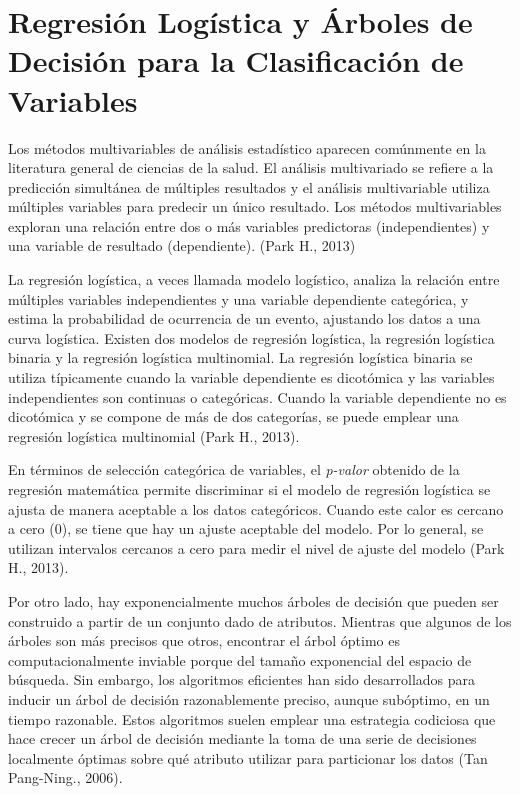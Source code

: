 \section{Regresión Logística y Árboles de Decisión para la Clasificación de Variables}
Los métodos multivariables de análisis estadístico aparecen comúnmente en la literatura general de ciencias de la salud. El análisis multivariado se refiere a la predicción simultánea de múltiples resultados y el análisis multivariable utiliza múltiples variables para predecir un único resultado. Los métodos multivariables exploran una relación entre dos o más variables predictoras (independientes) y una variable de resultado (dependiente). (Park H., 2013)

La regresión logística, a veces llamada modelo logístico, analiza la relación entre múltiples variables independientes y una variable dependiente categórica, y estima la probabilidad de ocurrencia de un evento, ajustando los datos a una curva logística. Existen dos modelos de regresión logística, la regresión logística binaria y la regresión logística multinomial. La regresión logística binaria se utiliza típicamente cuando la variable dependiente es dicotómica y las variables independientes son continuas o categóricas. Cuando la variable dependiente no es dicotómica y se compone de más de dos categorías, se puede emplear una regresión logística multinomial (Park H., 2013). 

En términos de selección categórica de variables, el \textit{p-valor} obtenido de la regresión matemática permite discriminar si el modelo de regresión logística se ajusta de manera aceptable a los datos categóricos. Cuando este calor es cercano a cero (0), se tiene que hay un ajuste aceptable del modelo. Por lo general, se utilizan intervalos cercanos a cero para medir el nivel de ajuste del modelo (Park H., 2013). 

Por otro lado, hay exponencialmente muchos árboles de decisión que pueden ser construido a partir de un conjunto dado de atributos. Mientras que algunos de los árboles son más precisos que otros, encontrar el árbol óptimo es computacionalmente inviable porque del tamaño exponencial del espacio de búsqueda.  Sin embargo, los algoritmos eficientes han sido desarrollados para inducir un árbol de decisión razonablemente preciso, aunque subóptimo, en un tiempo razonable.  Estos algoritmos suelen emplear una estrategia codiciosa que hace crecer un árbol de decisión mediante la toma de una serie de decisiones localmente óptimas sobre qué atributo utilizar para particionar los datos (Tan Pang-Ning., 2006). 